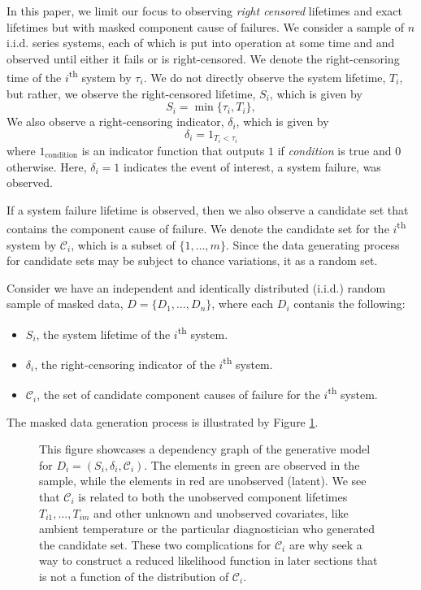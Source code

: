 \documentclass[
]{article}
\providecommand{\tightlist}{%
  \setlength{\itemsep}{0pt}\setlength{\parskip}{0pt}}
\begin{document}
In this paper, we limit our focus to observing \emph{right censored}
lifetimes and exact lifetimes but with masked component cause of
failures. We consider a sample of \(n\) i.i.d. series systems, each of
which is put into operation at some time and and observed until either
it fails or is right-censored. We denote the right-censoring time of the
\(i\)\textsuperscript{th} system by \(\tau_i\). We do not directly
observe the system lifetime, \(T_i\), but rather, we observe the
right-censored lifetime, \(S_i\), which is given by \begin{equation}
    S_i = \min\{\tau_i, T_i\},
\end{equation} We also observe a right-censoring indicator,
\(\delta_i\), which is given by \begin{equation}
    \delta_i = 1_{T_i < \tau_i}
\end{equation} where \(1_{\text{condition}}\) is an indicator function
that outputs \(1\) if \emph{condition} is true and \(0\) otherwise.
Here, \(\delta_i = 1\) indicates the event of interest, a system
failure, was observed.

If a system failure lifetime is observed, then we also observe a
candidate set that contains the component cause of failure. We denote
the candidate set for the \(i\)\textsuperscript{th} system by
\(\mathcal{C}_i\), which is a subset of \(\{1,\ldots,m\}\). Since the
data generating process for candidate sets may be subject to chance
variations, it as a random set.

Consider we have an independent and identically distributed (i.i.d.)
random sample of masked data, \(D = \{D_1, \ldots, D_n\}\), where each
\(D_i\) contanis the following:

\begin{itemize}
\tightlist
\item
  \(S_i\), the system lifetime of the \(i\)\textsuperscript{th} system.
\item
  \(\delta_i\), the right-censoring indicator of the
  \(i\)\textsuperscript{th} system.
\item
  \(\mathcal{C}_i\), the set of candidate component causes of failure
  for the \(i\)\textsuperscript{th} system.
\end{itemize}

The masked data generation process is illustrated by Figure
\ref{fig:figureone}.

\begin{figure}[h]
\centering{
\resizebox{0.5\textwidth}{!}{}}
\caption{This figure showcases a dependency graph of the generative model for
$D_i = (S_i,\delta_i,\mathcal{C}_i)$. The elements in green are observed in the sample,
while the elements in red are unobserved (latent). We see that $\mathcal{C}_i$ is
related to both the unobserved component lifetimes $T_{i 1},\ldots,T_{i m}$ and
other unknown and unobserved covariates, like ambient temperature or the
particular diagnostician who generated the candidate set. These two complications
for $\mathcal{C}_i$ are why seek a way to construct a reduced likelihood function
in later sections that is not a function of the distribution of $\mathcal{C}_i$.}
\label{fig:figureone}
\end{figure}
\end{document}
